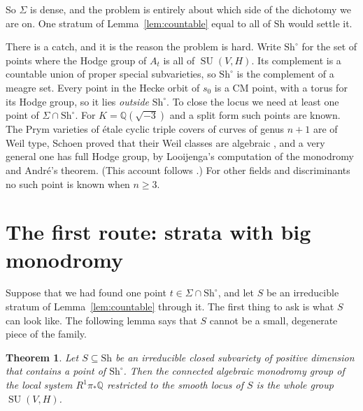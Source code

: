 \documentclass[11pt]{amsart}
\newtheorem{theorem}{Theorem}
\theoremstyle{definition}
\theoremstyle{remark}
\newcommand{\QQ}{\mathbb{Q}}
\newcommand{\SU}{\operatorname{SU}}
\newcommand{\Sh}{\mathrm{Sh}}
\begin{document}
So $\Sigma$ is dense, and the problem is entirely about which side of the
dichotomy we are on. One stratum of Lemma~\ref{lem:countable} equal to all
of $\Sh$ would settle it.

There is a catch, and it is the reason the problem is hard. Write $\Sh^{\circ}$
for the set of points where the Hodge group of $A_{t}$ is all of
$\SU(V,H)$. Its complement is a countable union of proper special
subvarieties, so $\Sh^{\circ}$ is the complement of a meagre set. Every
point in the Hecke orbit of $s_{0}$ is a CM point, with a torus for its
Hodge group, so it lies \emph{outside} $\Sh^{\circ}$. To close the locus
we need at least one point of $\Sigma\cap\Sh^{\circ}$. For
$K=\QQ(\sqrt{-3})$ and a split form such points are known. The Prym
varieties of \'etale cyclic triple covers of curves of genus $n+1$ are of
Weil type, Schoen proved that their Weil classes are algebraic
\cite{Sch88}, and a very general one has full Hodge group, by Looijenga's
computation of the monodromy \cite{Loo97} and Andr\'e's theorem. (This
account follows \cite{BhH8}.) For other fields and discriminants no such
point is known when $n\ge3$.

\section{The first route: strata with big monodromy}

Suppose that we had found one point $t\in\Sigma\cap\Sh^{\circ}$, and let
$S$ be an irreducible stratum of Lemma~\ref{lem:countable} through it. The
first thing to ask is what $S$ can look like. The following lemma says that
$S$ cannot be a small, degenerate piece of the family.

\begin{theorem}\label{thm:monodromy}
Let $S\subseteq\Sh$ be an irreducible closed subvariety of positive
dimension that contains a point of $\Sh^{\circ}$. Then the connected
algebraic monodromy group of the local system $R^{1}\pi_{*}\QQ$ restricted
to the smooth locus of $S$ is the whole group $\SU(V,H)$.
\end{theorem}
\end{document}
